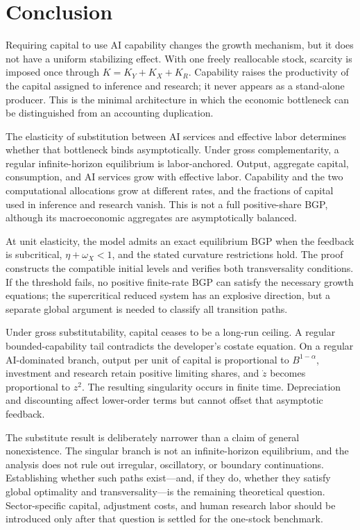 \section{Conclusion}
\label{sec:conclusion}

Requiring capital to use AI capability changes the growth mechanism, but it does not have a uniform stabilizing effect. With one freely reallocable stock, scarcity is imposed once through $K=K_Y+K_X+K_R$. Capability raises the productivity of the capital assigned to inference and research; it never appears as a stand-alone producer. This is the minimal architecture in which the economic bottleneck can be distinguished from an accounting duplication.

The elasticity of substitution between AI services and effective labor determines whether that bottleneck binds asymptotically. Under gross complementarity, a regular infinite-horizon equilibrium is labor-anchored. Output, aggregate capital, consumption, and AI services grow with effective labor. Capability and the two computational allocations grow at different rates, and the fractions of capital used in inference and research vanish. This is not a full positive-share BGP, although its macroeconomic aggregates are asymptotically balanced.

At unit elasticity, the model admits an exact equilibrium BGP when the feedback is subcritical, $\eta+\omega_X<1$, and the stated curvature restrictions hold. The proof constructs the compatible initial levels and verifies both transversality conditions. If the threshold fails, no positive finite-rate BGP can satisfy the necessary growth equations; the supercritical reduced system has an explosive direction, but a separate global argument is needed to classify all transition paths.

Under gross substitutability, capital ceases to be a long-run ceiling. A regular bounded-capability tail contradicts the developer's costate equation. On a regular AI-dominated branch, output per unit of capital is proportional to $B^{1-\alpha}$, investment and research retain positive limiting shares, and $\dot z$ becomes proportional to $z^2$. The resulting singularity occurs in finite time. Depreciation and discounting affect lower-order terms but cannot offset that asymptotic feedback.

The substitute result is deliberately narrower than a claim of general nonexistence. The singular branch is not an infinite-horizon equilibrium, and the analysis does not rule out irregular, oscillatory, or boundary continuations. Establishing whether such paths exist---and, if they do, whether they satisfy global optimality and transversality---is the remaining theoretical question. Sector-specific capital, adjustment costs, and human research labor should be introduced only after that question is settled for the one-stock benchmark.
